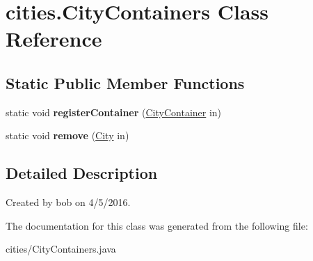 \hypertarget{classcities_1_1_city_containers}{}\section{cities.\+City\+Containers Class Reference}
\label{classcities_1_1_city_containers}
\subsection*{Static Public Member Functions}
\begin{DoxyCompactItemize}
\item 
static void {\bfseries register\+Container} (\hyperlink{interfacecities_1_1_city_container}{City\+Container} in)\hypertarget{classcities_1_1_city_containers_a8e66d2711d54d8632dd05de603674aad}{}\label{classcities_1_1_city_containers_a8e66d2711d54d8632dd05de603674aad}

\item 
static void {\bfseries remove} (\hyperlink{classcities_1_1_city}{City} in)\hypertarget{classcities_1_1_city_containers_adcc18f9e32c2de7aa00d86cf289f8df9}{}\label{classcities_1_1_city_containers_adcc18f9e32c2de7aa00d86cf289f8df9}

\end{DoxyCompactItemize}


\subsection{Detailed Description}
Created by bob on 4/5/2016. 

The documentation for this class was generated from the following file\+:\begin{DoxyCompactItemize}
\item 
cities/City\+Containers.\+java\end{DoxyCompactItemize}
